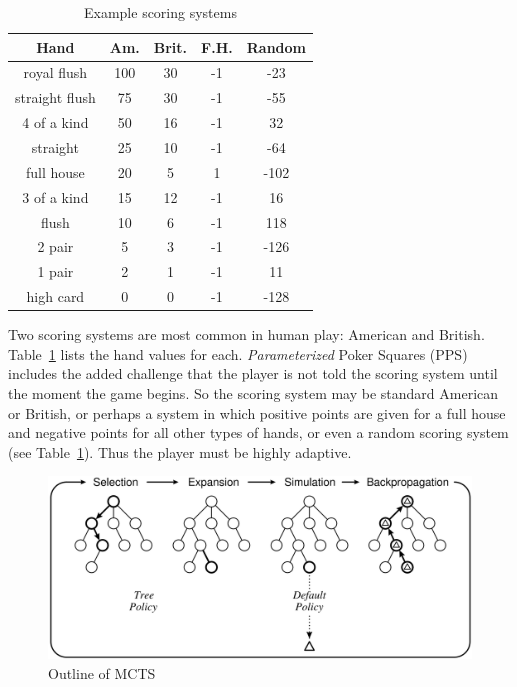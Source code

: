 \documentclass[letterpaper]{article}
\begin{document}
\begin{table}
\caption{Example scoring systems}
\label{tbl:scoring}
\centering
\begin{tabular}{c c c c c}
\hline
Hand & Am. & Brit. & F.H. & Random \\
\hline
royal flush     & 100 & 30 & -1 & -23 \\
straight flush & 75 & 30 & -1 & -55 \\
4 of a kind    & 50 & 16 & -1 & 32 \\
straight        & 25 & 10 & -1 & -64 \\
full house     & 20 & 5  & 1 & -102 \\
3 of a kind   & 15 & 12 & -1 & 16 \\
flush           & 10 & 6   & -1 & 118 \\
2 pair         & 5   & 3   & -1 & -126 \\
1 pair         & 2   & 1   & -1 & 11 \\
high card    & 0   & 0   & -1 & -128 \\
\hline
\end{tabular}
\end{table}

Two scoring systems are most common in human play: American and British. Table~\ref{tbl:scoring} lists the hand values for each. {\it Parameterized} Poker Squares (PPS) includes the added challenge that the player is not told the scoring system until the moment the game begins. So the scoring system may be standard American or British, or perhaps a system in which positive points are given for a full house and negative points for all other types of hands, or even a random scoring system (see Table~\ref{tbl:scoring}). Thus the player must be highly adaptive.

\begin{figure}[b]
\begin{center}
\includegraphics[width=.95\linewidth]{images/oneiteration.png}
\end{center}
\caption{Outline of MCTS~\cite{browne2012survey} }
\label{fig:OneIter}
\end{figure}
\end{document}
